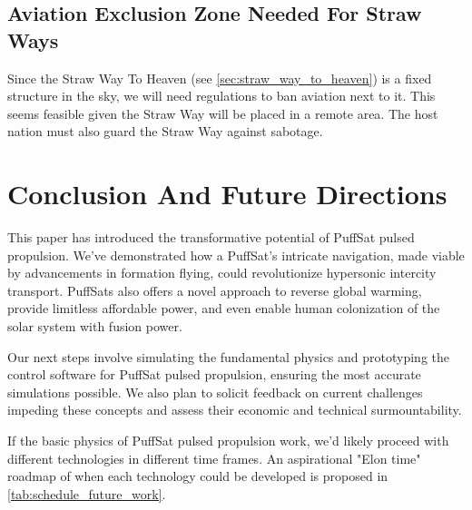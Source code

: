 \documentclass{article}
\begin{document}
\subsection{Aviation Exclusion Zone Needed For Straw Ways}
Since the Straw Way To Heaven (see \autoref{sec:straw_way_to_heaven}) is a fixed structure in the sky, we will need regulations to ban aviation next to it.   This seems feasible given the Straw Way will be placed in a remote area.   The host nation must also guard the Straw Way against sabotage.


\section{Conclusion And Future Directions}
This paper has introduced the transformative potential of PuffSat pulsed propulsion. We've demonstrated how a PuffSat's intricate navigation, made viable by advancements in formation flying, could revolutionize hypersonic intercity transport.  PuffSats also offers a novel approach to reverse global warming, provide limitless affordable power, and even enable human colonization of the solar system with fusion power. 

Our next steps involve simulating the fundamental physics and prototyping the control software for PuffSat pulsed propulsion, ensuring the most accurate simulations possible. We also plan to solicit feedback on current challenges impeding these concepts and assess their economic and technical surmountability.

If the basic physics of PuffSat pulsed propulsion work, we'd likely proceed with different technologies in different time frames.  An aspirational "Elon time" \cite{wiktionary_elon_time} roadmap of when each technology could be  developed is proposed in \autoref{tab:schedule_future_work}.
\end{document}

